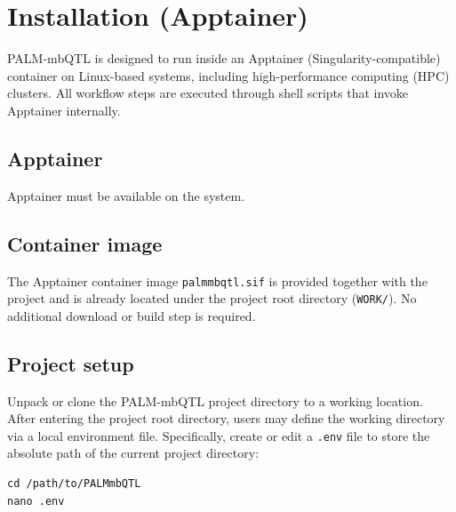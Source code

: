 \documentclass[11pt]{article}
\begin{document}


\section{Installation (Apptainer)}

PALM-mbQTL is designed to run inside an Apptainer (Singularity-compatible)
container on Linux-based systems, including high-performance computing (HPC)
clusters.
All workflow steps are executed through shell scripts that invoke Apptainer
internally.

\subsection{Apptainer}

Apptainer must be available on the system.

\subsection{Container image}

The Apptainer container image \texttt{palmmbqtl.sif} is provided together with
the project and is already located under the project root directory
(\texttt{WORK/}).
No additional download or build step is required.

\subsection{Project setup}

Unpack or clone the PALM-mbQTL project directory to a working location.
After entering the project root directory, users may define the working
directory via a local environment file.
Specifically, create or edit a \texttt{.env} file to store the absolute path
of the current project directory:

\begin{verbatim}
cd /path/to/PALMmbQTL
nano .env
\end{verbatim}
\end{document}
